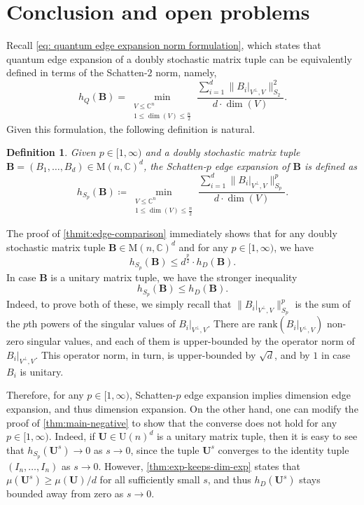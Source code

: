\documentclass[11pt]{article}
\newtheorem{definition}[theorem]{Definition}
\theoremstyle{plain}
\numberwithin{equation}{section}
\theoremstyle{definition}
\newcommand{\bC}{\mathbb{C}}
\newcommand{\rk}{\mathrm{rank}}
\newcommand{\norm}[1]{\lVert#1\rVert}
\newcommand{\M}{\mathrm{M}}
\newcommand{\U}{\mathrm{U}}
\newcommand{\tuple}[1]{\mathbf{#1}}
\newcommand{\vB}{\tuple{B}}
\newcommand{\vU}{\tuple{U}}
\begin{document}
\section{Conclusion and open problems}\label{sec:conclusion}
Recall \eqref{eq: quantum edge expansion norm formulation}, which states that quantum edge expansion of a doubly stochastic matrix tuple can be equivalently defined in terms of the Schatten-$2$ norm, namely, %
\[
    h_Q(\vB)=\min_{\substack{V \leq \bC^n\\1\leq\dim(V)\leq\frac{n}{2}}}\frac{\sum_{i=1}^d\norm{B_i|_{V^\perp,V}}_{S_2}^2}{d\cdot\dim(V)}.
\]
%
Given this formulation, the following definition is natural.
\begin{definition}
    Given $p \in [1,\infty)$ and a doubly stochastic matrix tuple $\vB=(B_1,\dots,B_d) \in \M(n,\bC)^d$, the \emph{Schatten-$p$ edge expansion} of $\vB$ is defined as
    \[
        h_{S_p}(\vB) \coloneqq \min_{\substack{V \leq \bC^n\\1\leq\dim(V)\leq\frac{n}{2}}}\frac{\sum_{i=1}^d\norm{B_i|_{V^\perp,V}}_{S_p}^p}{d\cdot\dim(V)}.
    \]
\end{definition}
The proof of \cref{thmit:edge-comparison} immediately shows that for any doubly stochastic matrix tuple $\vB \in \M(n,\bC)^d$ and for any $p \in [1,\infty)$, we have
\[
    h_{S_p}(\vB) \leq d^{\frac p2}\cdot h_D(\vB).
\]
In case $\vB$ is a unitary matrix tuple, we have the stronger inequality
\[
    h_{S_p}(\vB) \leq h_D(\vB).
\]
Indeed, to prove both of these, we simply recall that $\norm{B_i|_{V^\perp,V}}_{S_p}^p$ is the sum of the $p$th powers of the singular values of $B_i|_{V^\perp,V}$. There are $\rk(B_i|_{V^\perp,V})$ non-zero singular values, and each of them is upper-bounded by the operator norm of $B_i|_{V^\perp,V}$. This operator norm, in turn, is upper-bounded by $\sqrt d$, and by $1$ in case $B_i$ is unitary.

Therefore, for any $p \in [1,\infty)$, Schatten-$p$ edge expansion implies dimension edge expansion, and thus dimension expansion. On the other hand, one can modify the proof of \cref{thm:main-negative} to show that the converse does not hold for any $p \in [1,\infty)$. Indeed, if $\vU \in \U(n)^d$ is a unitary matrix tuple, then it is easy to see that $h_{S_p}(\vU^s) \to 0$ as $s \to 0$, since the tuple $\vU^s$ converges to the identity tuple $(I_n,\dots,I_n)$ as $s \to 0$. However, \cref{thm:exp-keeps-dim-exp} states that $\mu(\vU^s)\geq \mu(\vU)/d$ for all sufficiently small $s$, and thus $h_D(\vU^s)$ stays bounded away from zero as $s \to 0$.
\end{document}
